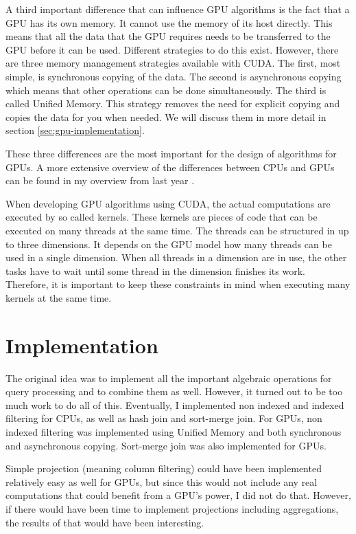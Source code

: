 \documentclass[a4paper,titlepage]{article}
\begin{document}
A third important difference that can influence GPU algorithms is the fact that a GPU has its own memory. It cannot use the memory of its host directly. This means that all the data that the GPU requires needs to be transferred to the GPU before it can be used. Different strategies to do this exist. However, there are three memory management strategies available with CUDA. The first, most simple, is synchronous copying of the data. The second is asynchronous copying which means that other operations can be done simultaneously. The third is called Unified Memory. This strategy removes the need for explicit copying and copies the data for you when needed. We will discuss them in more detail in section \ref{sec:gpu-implementation}.

These three differences are the most important for the design of algorithms for GPUs. A more extensive overview of the differences between CPUs and GPUs can be found in my overview from last year \cite{kostjens2015}.

When developing GPU algorithms using CUDA, the actual computations are executed by so called kernels. These kernels are pieces of code that can be executed on many threads at the same time. The threads can be structured in up to three dimensions. It depends on the GPU model how many threads can be used in a single dimension. When all threads in a dimension are in use, the other tasks have to wait until some thread in the dimension finishes its work. Therefore, it is important to keep these constraints in mind when executing many kernels at the same time.

\section{Implementation}
\label{sec:implementation}
The original idea was to implement all the important algebraic operations for query processing and to combine them as well. However, it turned out to be too much work to do all of this. Eventually, I implemented non indexed and indexed filtering for CPUs, as well as hash join and sort-merge join. For GPUs, non indexed filtering was implemented using Unified Memory and both synchronous and asynchronous copying. Sort-merge join was also implemented for GPUs.

Simple projection (meaning column filtering) could have been implemented relatively easy as well for GPUs, but since this would not include any real computations that could benefit from a GPU's power, I did not do that. However, if there would have been time to implement projections including aggregations, the results of that would have been interesting.
\end{document}
